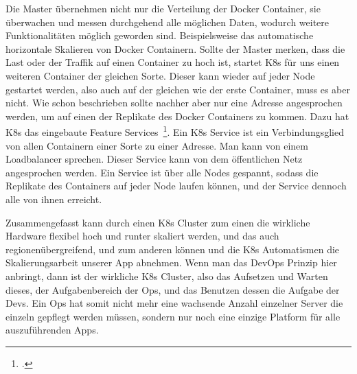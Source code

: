 Die Master übernehmen nicht nur die Verteilung der Docker Container, sie überwachen und messen durchgehend alle möglichen Daten, wodurch weitere Funktionalitäten möglich geworden sind.
Beispielsweise das automatische horizontale Skalieren von Docker Containern. Sollte der Master merken, dass die Last oder der Traffik auf einen Container zu hoch ist, startet K8s für uns einen weiteren Container der gleichen Sorte. 
Dieser kann wieder auf jeder Node gestartet werden, also auch auf der gleichen wie der erste Container, muss es aber nicht.
Wie schon beschrieben sollte nachher aber nur eine Adresse angesprochen werden, um auf einen der Replikate des Docker Containers zu kommen. Dazu hat K8s das eingebaute Feature Services~\footcite[Vgl. ][]{website:kube-svc}. Ein K8s Service ist ein Verbindungsglied
von allen Containern einer Sorte zu einer Adresse. Man kann von einem Loadbalancer sprechen. Dieser Service kann von dem öffentlichen Netz angesprochen werden. Ein Service ist über alle Nodes gespannt, sodass die 
Replikate des Containers auf jeder Node laufen können, und der Service dennoch alle von ihnen erreicht.

Zusammengefasst kann durch einen K8s Cluster zum einen die wirkliche Hardware flexibel hoch und runter skaliert werden, und das auch regionenübergreifend, und zum anderen können und die K8s Automatismen die Skalierungsarbeit unserer App abnehmen.
Wenn man das DevOps Prinzip hier anbringt, dann ist der wirkliche K8s Cluster, also das Aufsetzen und Warten dieses, der Aufgabenbereich der Ops, und das Benutzen dessen die Aufgabe der Devs.
Ein Ops hat somit nicht mehr eine wachsende Anzahl einzelner Server die einzeln gepflegt werden müssen, sondern nur noch eine einzige Platform für alle auszuführenden Apps.

